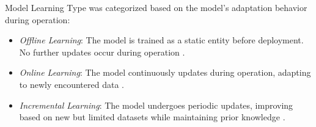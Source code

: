 Model Learning Type was categorized based on the model's adaptation behavior during operation:
\begin{itemize}[noitemsep, topsep=0pt]
    \item \textit{Offline Learning}: The model is trained as a static entity before deployment. No further updates occur during operation \cite{capogrossoMachineLearningOrientedSurvey2024}.
    \item \textit{Online Learning}: The model continuously updates during operation, adapting to newly encountered data \cite{renOndeviceOnlineLearning2024}.
    \item \textit{Incremental Learning}: The model undergoes periodic updates, improving based on new but limited datasets while maintaining prior knowledge \cite{disabatoIncrementalOnDeviceTiny2020}.
\end{itemize}

